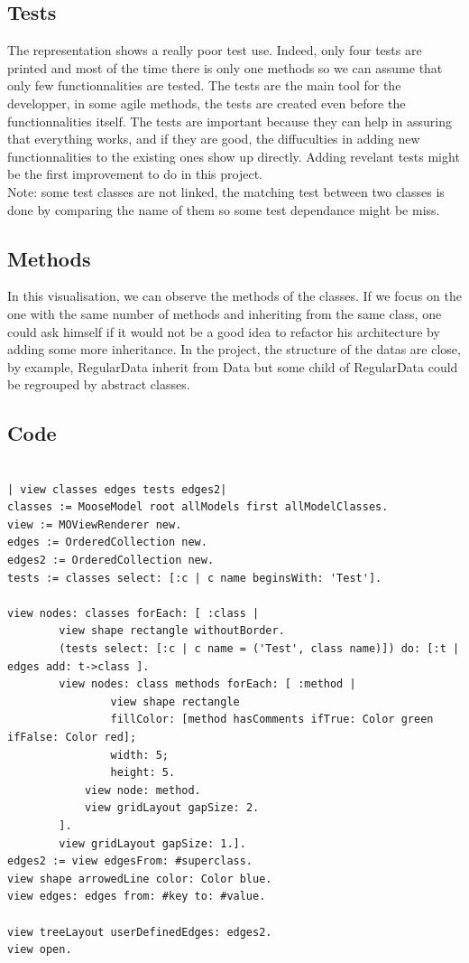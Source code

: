 \documentclass[a4paper,10pt]{article}
\begin{document}
\subsection{Tests}
The representation shows a really poor test use. Indeed, only four tests are printed and most of the time there is only one methods so we can assume that only few functionnalities are tested. The tests are the main tool for the developper, in some agile methods, the tests are created even before the functionnalities itself. The tests are important because they can help in assuring that everything works, and if they are good, the diffuculties in adding new functionnalities to the existing ones show up directly. Adding revelant tests might be the first improvement to do in this project.\\
Note: some test classes are not linked, the matching test between two classes is done by comparing the name of them so some test dependance might be miss.

\subsection{Methods}
In this visualisation, we can observe the methods of the classes. If we focus on the one with the same number of methods and inheriting from the same class, one could ask himself if it would not be a good idea to refactor his architecture by adding some more inheritance. In the project, the structure of the datas are close, by example, RegularData inherit from Data but some child of RegularData could be regrouped by abstract classes.

\newpage
\subsection{Code}
\begin{verbatim}

| view classes edges tests edges2|
classes := MooseModel root allModels first allModelClasses.
view := MOViewRenderer new.
edges := OrderedCollection new.
edges2 := OrderedCollection new.
tests := classes select: [:c | c name beginsWith: 'Test'].

view nodes: classes forEach: [ :class |
        view shape rectangle withoutBorder.
        (tests select: [:c | c name = ('Test', class name)]) do: [:t | edges add: t->class ].
        view nodes: class methods forEach: [ :method | 
                view shape rectangle 
                fillColor: [method hasComments ifTrue: Color green ifFalse: Color red];
                width: 5;
                height: 5.
            view node: method. 
            view gridLayout gapSize: 2.
        ].
        view gridLayout gapSize: 1.].
edges2 := view edgesFrom: #superclass.
view shape arrowedLine color: Color blue.
view edges: edges from: #key to: #value.

view treeLayout userDefinedEdges: edges2.
view open.
\end{verbatim}
\end{document}
